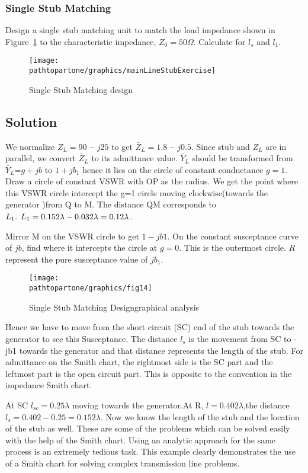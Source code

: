 \begin{exmp}
\subsubsection*{Single Stub Matching}
Design a single stub matching unit to match the load impedance shown in Figure~\ref{fig:figw} to the characteristic impedance, $Z_0 = 50\varOmega$. Calculate for $l_s$ and $l_1$.
\begin{figure}[h]
\centering
\texttt{[image: \\pathtopartone/graphics/mainLineStubExercise]}
\caption{Single Stub Matching design}
\label{fig:figw}
\end{figure}

\subsection*{Solution}
We normalize $Z_L=90-j25$ to get 
$\bar{Z}_L=1.8-j0.5$. Since stub and $Z_L$ are in parallel,
we convert $\bar{Z}_L$ to its admittance value. $\bar{Y}_{L}$
should be transformed from 
$\bar{Y}_{L}$=$g+jb$ to $1+jb_1$ hence it lies on the circle of constant conductance $g=1$. Draw a circle of constant VSWR with OP as the radius. We get the point where this VSWR circle intercept the g=1 circle moving clockwise(towards the generator )from Q to M. The distance QM corresponds to $L_1.\hspace{0.15cm} L_1=0.152\lambda-0.032\lambda=0.12\lambda$.

Mirror M on the VSWR circle to get $1-jb1$. On the constant susceptance curve of $jb$, find where it intercepts the circle at $g=0$. This is the outermost circle. $R$ represent the pure susceptance value of $jb_1$. 
\begin{figure}[h]
\centering
\texttt{[image: \\pathtopartone/graphics/fig14]}
\caption{Single Stub Matching Design\textemdash\;graphical analysis}
\label{fig:fig14}
\end{figure}

Hence we have to move from the short circuit (SC) end of the stub towards the generator to see this Susceptance. The distance $l_s$ is the movement from SC to -jb1 towards the generator and that distance represents the length of the stub. For admittance on the Smith chart, the rightmost side is the SC part and the leftmost part is the open circuit part. This is opposite to the convention in the impedance Smith chart.

At SC $l_{sc}=0.25\lambda$ moving towards the generator.At R, $l=0.402\lambda$,the distance $l_s=0.402-0.25=0.152\lambda$. Now we know the length of the stub and the location of the stub as well. These are some of the problems which can be solved easily with the help of the Smith chart. Using an analytic approach for the same process is an extremely tedious task. This example clearly demonstrates the use of a Smith chart for solving complex transmission line problems.
\end{exmp}

